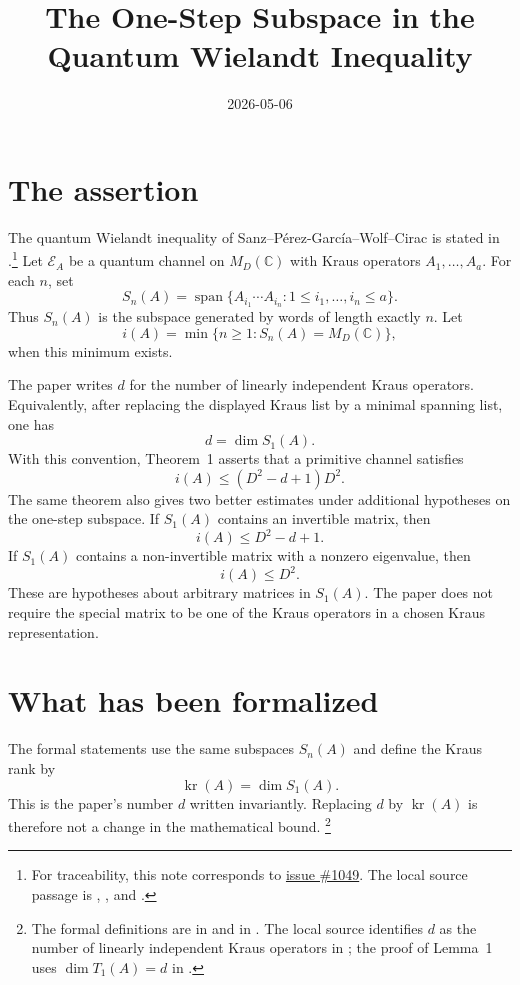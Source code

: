 \documentclass{article}
\title{The One-Step Subspace in the Quantum Wielandt Inequality}
\author{}
\date{2026-05-06}
\begin{document}
\maketitle

\section{The assertion}

The quantum Wielandt inequality of Sanz--P\'erez-Garc\'ia--Wolf--Cirac is
stated in \cite[Theorem~1]{Sanz2010Quantum}.\footnote{For
    traceability, this note corresponds to
    \href{https://github.com/LionSR/TNLean/issues/1049}{issue \#1049}. The local
    source passage is ,
    , and
    .}
Let $\mathcal E_A$ be a quantum channel on $M_D(\mathbb C)$ with Kraus
operators $A_1,\ldots,A_a$. For each $n$, set
\[
    S_n(A)=\operatorname{span}\{A_{i_1}\cdots A_{i_n}:1\leq i_1,\ldots,i_n\leq a\}.
\]
Thus $S_n(A)$ is the subspace generated by words of length exactly $n$. Let
\[
    i(A)=\min\{n\geq 1:S_n(A)=M_D(\mathbb C)\},
\]
when this minimum exists.

The paper writes $d$ for the number of linearly independent Kraus operators.
Equivalently, after replacing the displayed Kraus list by a minimal spanning
list, one has
\[
    d=\dim S_1(A).
\]
With this convention, Theorem~1 asserts that a primitive channel satisfies
\[
    i(A)\leq (D^2-d+1)D^2.
\]
The same theorem also gives two better estimates under additional hypotheses
on the one-step subspace. If $S_1(A)$ contains an invertible matrix, then
\[
    i(A)\leq D^2-d+1.
\]
If $S_1(A)$ contains a non-invertible matrix with a nonzero eigenvalue, then
\[
    i(A)\leq D^2.
\]
These are hypotheses about arbitrary matrices in $S_1(A)$. The paper does not
require the special matrix to be one of the Kraus operators in a chosen Kraus
representation.

\section{What has been formalized}

The formal statements use the same subspaces $S_n(A)$ and define the Kraus
rank by
\[
    \operatorname{kr}(A)=\dim S_1(A).
\]
This is the paper's number $d$ written invariantly. Replacing $d$ by
$\operatorname{kr}(A)$ is therefore not a change in the mathematical bound.
\footnote{The formal definitions are  in
     and
     in
    . The local
    source identifies $d$ as the number of linearly independent Kraus operators in
    ; the proof of Lemma~1 uses
    $\dim T_1(A)=d$ in .}
\end{document}
